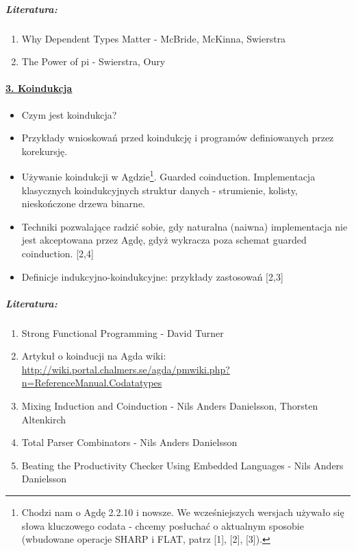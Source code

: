 \documentclass[10pt, a4paper]{article}
\begin{document}
\subparagraph{Literatura:}

\begin{enumerate}
\addtolength{\itemsep}{-0.5\baselineskip}

 \item Why Dependent Types Matter - McBride, McKinna, Swierstra
 \item The Power of pi - Swierstra, Oury
\end{enumerate}


\paragraph{\underline{3. Koindukcja}} 

\begin{itemize}
\addtolength{\itemsep}{-0.5\baselineskip}

 \item Czym jest koindukcja?
 \item Przykłady wnioskowań przed koindukcję i programów definiowanych przez korekursję.
 \item Używanie koindukcji w Agdzie\footnote{
Chodzi nam o Agdę 2.2.10 i nowsze. We wcześniejszych wersjach używało się słowa kluczowego codata - chcemy posłuchać o aktualnym sposobie (wbudowane operacje SHARP i FLAT, patrz [1], [2], [3]).
}. Guarded coinduction. Implementacja klasycznych koindukcyjnych struktur danych - strumienie, kolisty, nieskończone drzewa binarne.
 \item Techniki pozwalające radzić sobie, gdy naturalna (naiwna) implementacja nie jest akceptowana przez Agdę, gdyż wykracza poza schemat guarded coinduction. [2,4]
 \item Definicje indukcyjno-koindukcyjne: przykłady zastosowań [2,3]
\end{itemize}

\subparagraph{Literatura:}

\begin{enumerate}
\addtolength{\itemsep}{-0.5\baselineskip}
 \item Strong Functional Programming - David Turner
 \item Artykuł o koinducji na Agda wiki: \\ {\small
       \url{http://wiki.portal.chalmers.se/agda/pmwiki.php?n=ReferenceManual.Codatatypes}
      }
 \item Mixing Induction and Coinduction - Nils Anders Danielsson, Thorsten Altenkirch
 \item Total Parser Combinators - Nils Anders Danielsson
 \item Beating the Productivity Checker Using Embedded Languages - Nils Anders Danielsson
\end{enumerate}
\end{document}
